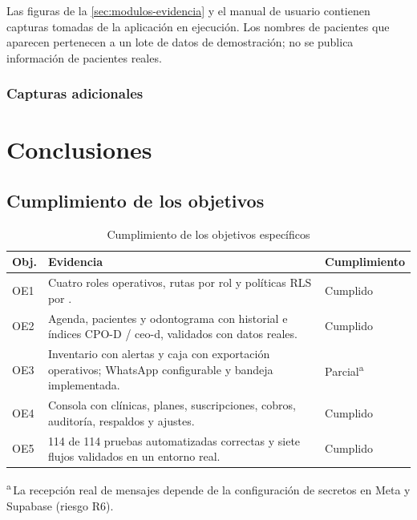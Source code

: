 \documentclass[11pt]{article}
\begin{document}
Las figuras de la \cref{sec:modulos-evidencia} y el manual de usuario contienen capturas tomadas de la aplicación en ejecución. Los nombres de pacientes que aparecen pertenecen a un lote de datos de demostración; no se publica información de pacientes reales.

\subsubsection*{Capturas adicionales}\label{sec:modulos-evidencia}


\section{Conclusiones}

\subsection{Cumplimiento de los objetivos}

\begin{table}[H]
\centering\small
\caption{Cumplimiento de los objetivos específicos}\label{tab:cumplimiento}
\begin{tabularx}{\linewidth}{@{}p{1.1cm}LP{2.2cm}@{}}
\toprule
\textbf{Obj.} & \textbf{Evidencia} & \textbf{Cumplimiento} \\
\midrule
OE1 & Cuatro roles operativos, rutas por rol y políticas RLS por . & Cumplido \\
OE2 & Agenda, pacientes y odontograma con historial e índices CPO-D / ceo-d, validados con datos reales. & Cumplido \\
OE3 & Inventario con alertas y caja con exportación operativos; WhatsApp configurable y bandeja implementada. & Parcial\textsuperscript{a} \\
OE4 & Consola con clínicas, planes, suscripciones, cobros, auditoría, respaldos y ajustes. & Cumplido \\
OE5 & 114 de 114 pruebas automatizadas correctas y siete flujos validados en un entorno real. & Cumplido \\
\bottomrule
\end{tabularx}
\par\smallskip\raggedright\footnotesize\textsuperscript{a}\,La recepción real de mensajes depende de la configuración de secretos en Meta y Supabase (riesgo R6).
\end{table}
\end{document}
